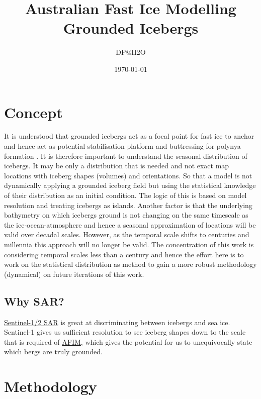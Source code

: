 \documentclass[11pt]{article}
\author{DP@H2O}
\date{\today}
\title{Australian Fast Ice Modelling\\\medskip
\large Grounded Icebergs}
\begin{document}
\maketitle
\tableofcontents


\section{Concept}
\label{sec:org034ad6e}

 It is understood that grounded icebergs act as a focal point for
fast ice to anchor \cite{zotero://select/items/1_6DH4IZVS}
and
 hence act as potential stabilisation platform and buttressing for polynya formation \cite{}. It is
 therefore important to understand the seasonal distribution of icebergs. It may be only a
 distribution that is needed and not exact map locations with iceberg shapes (volumes) and
 orientations. So that a model is not dynamically applying a grounded iceberg field but using the
 statistical knowledge of their distribution as an initial condition. The logic of this is based on
 model resolution and treating icebergs as islands. Another factor is that the underlying
 bathymetry on which icebergs ground is not changing on the same timescale as the
 ice-ocean-atmosphere and hence a seasonal approximation of locations will be valid over decadal
 scales. However, as the temporal scale shifts to centuries and millennia this approach will no
 longer be valid. The concentration of this work is considering temporal scales less than a century
 and hence the effort here is to work on the statistical distribution as method to gain a more
 robust methodology (dynamical) on future iterations of this work.

\subsection{Why SAR?}
\label{sec:org0550808}

\href{https://sentinels.copernicus.eu/web/sentinel/user-guides/sentinel-1-sar/overview}{Sentinel-1/2 SAR} is great at discriminating between icebergs and sea ice. Sentinel-1 gives us
sufficient resolution to see iceberg shapes down to the scale that is required of \href{https://github.com/dpath2o/AFIM}{AFIM}, which
gives the potential for us to unequivocally state which bergs are
truly grounded.

\section{Methodology}
\label{sec:org4df0190}
\end{document}
